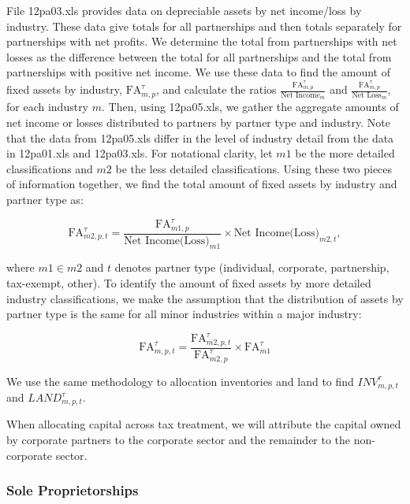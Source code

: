 \documentclass[article,11pt,letterpaper,fleqn]{article}
\theoremstyle{definition}
\numberwithin{equation}{section}
\begin{document}
File 12pa03.xls provides data on depreciable assets by net income/loss by industry.  These data give totals for all partnerships and then totals separately for partnerships with net profits.  We determine the total from partnerships with net losses as the difference between the total for all partnerships and the total from partnerships with positive net income.  We use these data to find the amount of fixed assets by industry, $\text{FA}^{\tau}_{m,p}$, and calculate the ratios $\frac{\text{FA}^{\tau}_{m,p}}{\text{Net Income}_{m}}$ and $\frac{\text{FA}^{\tau}_{m,p}}{\text{Net Loss}_{m}}$, for each industry $m$.  Then, using 12pa05.xls, we gather the aggregate amounts of net income or losses distributed to partners by partner type and industry.  Note that the data from 12pa05.xls differ in the level of industry detail from the data in 12pa01.xls and 12pa03.xls.  For notational clarity, let $m1$ be the more detailed classifications and $m2$ be the less detailed classifications.  Using these two pieces of information together, we find the total amount of fixed assets by industry and partner type as:  

\begin{equation}
\text{FA}^{\tau}_{m2,p,t}=  \frac{\text{FA}^{\tau}_{m1,p}}{\text{Net Income(Loss)}_{m1}} \times \text{Net Income(Loss)}_{m2,t},
\end{equation}

\noindent\noindent where $m1\in m2$ and $t$ denotes partner type (individual, corporate, partnership, tax-exempt, other).  To identify the amount of fixed assets by more detailed industry classifications, we make the assumption that the distribution of assets by partner type is the same for all minor industries within a major industry:

\begin{equation}
\text{FA}^{\tau}_{m,p,t}=  \frac{\text{FA}^{\tau}_{m2,p,t}}{\text{FA}^{\tau}_{m2,p}} \times \text{FA}^{\tau}_{m1}
\end{equation}

We use the same methodology to allocation inventories and land to find ${INV}^{\tau}_{m,p,t}$ and ${LAND}^{\tau}_{m,p,t}$. 

When allocating capital across tax treatment, we will attribute the capital owned by corporate partners to the corporate sector and the remainder to the non-corporate sector.


\subsubsection{Sole Proprietorships}
\end{document}
